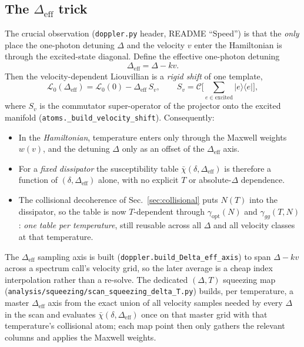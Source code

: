 \documentclass[11pt]{article}
\newcommand{\ketbra}[2]{\lvert #1 \rangle\!\langle #2 \rvert}
\newcommand{\eff}{\mathrm{eff}}
\newcommand{\code}[1]{\texttt{#1}}
\newcommand{\Lcal}{\mathcal{L}}
\newcommand{\rhobar}{\bar{\chi}}
\begin{document}
\subsection{The \boldmath$\Delta_\eff$ trick}

The crucial observation (\code{doppler.py} header, README ``Speed'') is that the
\emph{only} place the one-photon detuning $\Delta$ and the velocity $v$ enter the
Hamiltonian is through the excited-state diagonal. Define the effective one-photon
detuning
\begin{equation}
\Delta_\eff=\Delta-k v.
\end{equation}
Then the velocity-dependent Liouvillian is a \emph{rigid shift} of one template,
\begin{equation}
\Lcal_0(\Delta_\eff)=\Lcal_0(0)-\Delta_\eff\,S_v,
\qquad
S_v=\mathcal{C}\Big[\textstyle\sum_{e\in\text{excited}}\ketbra{e}{e}\Big],
\label{eq:deffshift}
\end{equation}
where $S_v$ is the commutator super-operator of the projector onto the excited
manifold (\code{atoms.\_build\_velocity\_shift}). Consequently:
\begin{itemize}[leftmargin=1.6em]
  \item In the \emph{Hamiltonian}, temperature enters only through the Maxwell
  weights $w(v)$, and the detuning $\Delta$ only as an offset of the
  $\Delta_\eff$ axis.
  \item For a \emph{fixed dissipator} the susceptibility table
  $\rhobar(\delta,\Delta_\eff)$ is therefore a function of
  $(\delta,\Delta_\eff)$ alone, with no explicit $T$ or absolute-$\Delta$
  dependence.
  \item The collisional decoherence of Sec.~\ref{sec:collisional} puts $N(T)$
  into the dissipator, so the table is now $T$-dependent through
  $\gamma_{\text{opt}}(N)$ and $\gamma_{gg}(T,N)$: \emph{one table per
  temperature}, still reusable across all $\Delta$ and all velocity classes at
  that temperature.
\end{itemize}
The $\Delta_\eff$ sampling axis is built (\code{doppler.build\_Delta\_eff\_axis})
to span $\Delta-k v$ across a spectrum call's velocity grid, so the later average
is a cheap index interpolation rather than a re-solve. The dedicated
$(\Delta,T)$ squeezing map
(\code{analysis/squeezing/scan\_squeezing\_delta\_T.py}) builds,
per temperature, a master $\Delta_\eff$ axis from the exact union of all velocity
samples needed by every $\Delta$ in the scan and evaluates
$\rhobar(\delta,\Delta_\eff)$ once on that master grid with that temperature's
collisional atom; each map point then only gathers the relevant columns and
applies the Maxwell weights.
\end{document}

